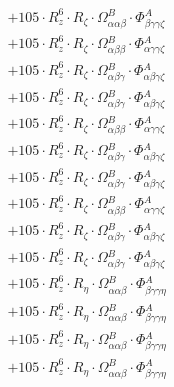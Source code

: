 \documentclass{article}
\begin{document}
\begin{subequations}
\begin{gather}
\begin{array}{c}
 \\[0.2em] 		 + 105 \cdot R_{z}^{6} \cdot R_{\zeta{}} \cdot \Omega{}^{B}_{\alpha{}\alpha{}\beta{}} \cdot \Phi{}^{A}_{\beta{}\gamma{}\gamma{}\zeta{}} 
 \\[0.2em] 		 + 105 \cdot R_{z}^{6} \cdot R_{\zeta{}} \cdot \Omega{}^{B}_{\alpha{}\beta{}\beta{}} \cdot \Phi{}^{A}_{\alpha{}\gamma{}\gamma{}\zeta{}} 
 \\[0.2em] 		 + 105 \cdot R_{z}^{6} \cdot R_{\zeta{}} \cdot \Omega{}^{B}_{\alpha{}\beta{}\gamma{}} \cdot \Phi{}^{A}_{\alpha{}\beta{}\gamma{}\zeta{}} 
 \\[0.2em] 		 + 105 \cdot R_{z}^{6} \cdot R_{\zeta{}} \cdot \Omega{}^{B}_{\alpha{}\beta{}\gamma{}} \cdot \Phi{}^{A}_{\alpha{}\beta{}\gamma{}\zeta{}} 
 \\[0.2em] 		 + 105 \cdot R_{z}^{6} \cdot R_{\zeta{}} \cdot \Omega{}^{B}_{\alpha{}\beta{}\beta{}} \cdot \Phi{}^{A}_{\alpha{}\gamma{}\gamma{}\zeta{}} 
 \\[0.2em] 		 + 105 \cdot R_{z}^{6} \cdot R_{\zeta{}} \cdot \Omega{}^{B}_{\alpha{}\beta{}\gamma{}} \cdot \Phi{}^{A}_{\alpha{}\beta{}\gamma{}\zeta{}} 
 \\[0.2em] 		 + 105 \cdot R_{z}^{6} \cdot R_{\zeta{}} \cdot \Omega{}^{B}_{\alpha{}\beta{}\gamma{}} \cdot \Phi{}^{A}_{\alpha{}\beta{}\gamma{}\zeta{}} 
 \\[0.2em] 		 + 105 \cdot R_{z}^{6} \cdot R_{\zeta{}} \cdot \Omega{}^{B}_{\alpha{}\beta{}\beta{}} \cdot \Phi{}^{A}_{\alpha{}\gamma{}\gamma{}\zeta{}} 
 \\[0.2em] 		 + 105 \cdot R_{z}^{6} \cdot R_{\zeta{}} \cdot \Omega{}^{B}_{\alpha{}\beta{}\gamma{}} \cdot \Phi{}^{A}_{\alpha{}\beta{}\gamma{}\zeta{}} 
 \\[0.2em] 		 + 105 \cdot R_{z}^{6} \cdot R_{\zeta{}} \cdot \Omega{}^{B}_{\alpha{}\beta{}\gamma{}} \cdot \Phi{}^{A}_{\alpha{}\beta{}\gamma{}\zeta{}} 
 \\[0.2em] 		 + 105 \cdot R_{z}^{6} \cdot R_{\eta{}} \cdot \Omega{}^{B}_{\alpha{}\alpha{}\beta{}} \cdot \Phi{}^{A}_{\beta{}\gamma{}\gamma{}\eta{}} 
 \\[0.2em] 		 + 105 \cdot R_{z}^{6} \cdot R_{\eta{}} \cdot \Omega{}^{B}_{\alpha{}\alpha{}\beta{}} \cdot \Phi{}^{A}_{\beta{}\gamma{}\gamma{}\eta{}} 
 \\[0.2em] 		 + 105 \cdot R_{z}^{6} \cdot R_{\eta{}} \cdot \Omega{}^{B}_{\alpha{}\alpha{}\beta{}} \cdot \Phi{}^{A}_{\beta{}\gamma{}\gamma{}\eta{}} 
 \\[0.2em] 		 + 105 \cdot R_{z}^{6} \cdot R_{\eta{}} \cdot \Omega{}^{B}_{\alpha{}\alpha{}\beta{}} \cdot \Phi{}^{A}_{\beta{}\gamma{}\gamma{}\eta{}} 

\end{array}
\end{gather}
\end{subequations}
\end{document}
